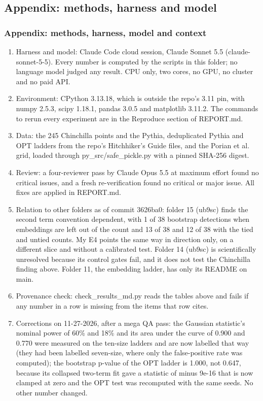 \subsection*{Appendix: methods, harness and model}
\subsubsection*{Appendix: methods, harness, model and context}

\begin{enumerate}
  \item Harness and model: Claude Code cloud session, Claude Sonnet 5.5 (claude-sonnet-5-5). Every number is computed by the scripts in this folder; no language model judged any result. CPU only, two cores, no GPU, no cluster and no paid API.
  \item Environment: CPython 3.13.18, which is outside the repo's 3.11 pin, with numpy 2.5.3, scipy 1.18.1, pandas 3.0.5 and matplotlib 3.11.2. The commands to rerun every experiment are in the Reproduce section of REPORT.md.
  \item Data: the 245 Chinchilla points and the Pythia, deduplicated Pythia and OPT ladders from the repo's Hitchhiker's Guide files, and the Porian et al. grid, loaded through py\_src/safe\_pickle.py with a pinned SHA-256 digest.
  \item Review: a four-reviewer pass by Claude Opus 5.5 at maximum effort found no critical issues, and a fresh re-verification found no critical or major issue. All fixes are applied in REPORT.md.
  \item Relation to other folders as of commit 3626ba0: folder 15 (ub9sc) finds the second term convention dependent, with 1 of 38 bootstrap detections when embeddings are left out of the count and 13 of 38 and 12 of 38 with the tied and untied counts. My E4 points the same way in direction only, on a different slice and without a calibrated test. Folder 14 (ub9sc) is scientifically unresolved because its control gates fail, and it does not test the Chinchilla finding above. Folder 11, the embedding ladder, has only its README on main.
  \item Provenance check: check\_results\_md.py reads the tables above and fails if any number in a row is missing from the items that row cites.
  \item Corrections on 11-27-2026, after a mega QA pass: the Gaussian statistic's nominal power of 60\% and 18\% and its area under the curve of 0.900 and 0.770 were measured on the ten-size ladders and are now labelled that way (they had been labelled seven-size, where only the false-positive rate was computed); the bootstrap p-value of the OPT ladder is 1.000, not 0.647, because its collapsed two-term fit gave a statistic of minus 9e-16 that is now clamped at zero and the OPT test was recomputed with the same seeds. No other number changed.

\end{enumerate}
